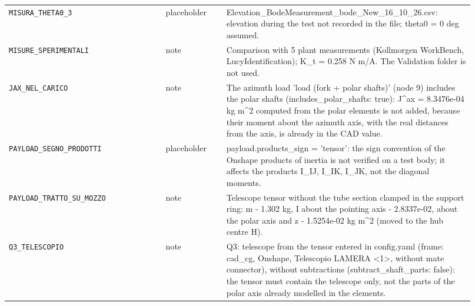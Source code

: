 \documentclass[10pt,a4paper]{article}
\numberwithin{equation}{section}
\begin{document}
\begin{longtable}{p{0.31\linewidth}p{0.12\linewidth}p{0.49\linewidth}}
\texttt{MISURA\_THETA0\_3} & placeholder & Elevation\_BodeMeasurement\_bode\_New\_16\_10\_26.csv: elevation during the test not recorded in the file; theta0 = 0 deg assumed. \\
\texttt{MISURE\_SPERIMENTALI} & note & Comparison with 5 plant measurements (Kollmorgen WorkBench, LucyIdentification); K\_t = 0.258 N m/A. The Validation folder is not used. \\
\texttt{JAX\_NEL\_CARICO} & note & The azimuth load 'load (fork + polar shafts)' (node 9) includes the polar shafts (includes\_polar\_shafts: true): J\^{}ax = 8.3476e-04 kg m\^{}2 computed from the polar elements is not added, because their moment about the azimuth axis, with the real distances from the axis, is already in the CAD value. \\
\texttt{PAYLOAD\_SEGNO\_PRODOTTI} & placeholder & payload.products\_sign = 'tensor': the sign convention of the Onshape products of inertia is not verified on a test body; it affects the products I\_IJ, I\_IK, I\_JK, not the diagonal moments. \\
\texttt{PAYLOAD\_TRATTO\_SU\_MOZZO} & note & Telescope tensor without the tube section clamped in the support ring: m - 1.302 kg, I about the pointing axis - 2.8337e-02, about the polar axis and z - 1.5254e-02 kg m\^{}2 (moved to the hub centre H). \\
\texttt{Q3\_TELESCOPIO} & note & Q3: telescope from the tensor entered in config.yaml (frame: cad\_cg, Onshape, Telescopio LAMERA <1>, without mate connector), without subtractions (subtract\_shaft\_parts: false): the tensor must contain the telescope only, not the parts of the polar axis already modelled in the elements. \\
\bottomrule\end{longtable}
\end{document}
